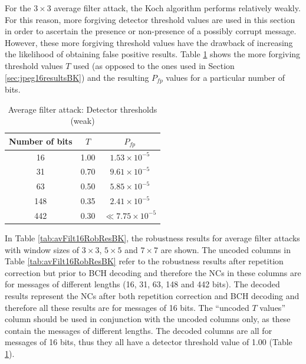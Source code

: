 \documentclass[12pt]{report}
\begin{document}
For the $3\times 3$ average filter attack, the Koch algorithm performs relatively weakly.
For this reason, more forgiving detector threshold values are used in this section in order to ascertain the 
presence or non-presence of a possibly corrupt message. However, these more forgiving threshold values have 
the drawback of increasing the likelihood
of obtaining false positive results. Table \ref{tab:NwTPfpAvFiltBK} shows the more forgiving threshold values $T$ used 
(as opposed to the ones used in Section \ref{sec:jpeg16resultsBK}) 
and the resulting $P_{fp}$ values for a particular number of bits.
\begin{table}[htb]
\scriptsize
    \begin{center}
	\begin{tabular}{|c|c|c|} \hline
		Number of bits	& $T$	& $P_{fp}$		\\ \hline
		16		& 1.00	& $1.53 \times 10^{-5}$ \\ \hline
		31		& 0.70	& $9.61 \times 10^{-5}$ \\ \hline
		63		& 0.50	& $5.85 \times 10^{-5}$ \\ \hline
		148		& 0.35	& $2.41 \times 10^{-5}$ \\ \hline
		442		& 0.30	& $\ll 7.75 \times 10^{-5}$ \\ \hline
	\end{tabular}
	\caption{Average filter attack: Detector thresholds (weak)}
	\label{tab:NwTPfpAvFiltBK}
    \end{center}
\normalsize
\end{table}

In Table \ref{tab:avFilt16RobResBK}, the robustness results for average filter attacks with 
window sizes of $3\times 3$, $5\times 5$ and $7\times 7$ are shown. The uncoded
columns in Table \ref{tab:avFilt16RobResBK} refer to the robustness results after repetition correction but
prior to BCH decoding and therefore the NCs in these columns are 
for messages of different lengths (16, 31, 63, 148 and 442 bits).
The decoded results represent the NCs after both repetition correction and BCH decoding and therefore
all these results are for messages of 16 bits. The ``uncoded $T$ values'' column should be used 
in conjunction with the uncoded columns only, as these contain the messages of different lengths.
The decoded columns are all for messages of 16 bits, thus they all have a detector threshold value of 1.00
(Table \ref{tab:NwTPfpAvFiltBK}).
\end{document}
